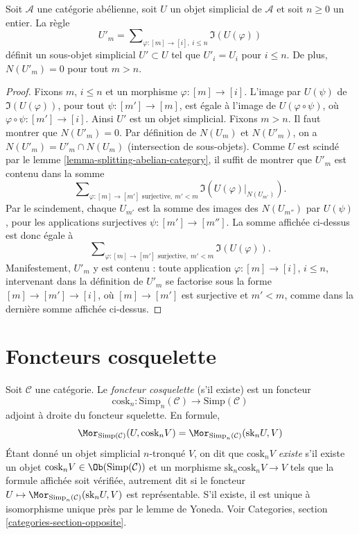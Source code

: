 \begin{lemma}
\label{lemma-simplicial-abelian-n-skel-sub}
Soit $\mathcal{A}$ une catégorie abélienne, soit $U$ un objet simplicial
de $\mathcal{A}$ et soit $n \geq 0$ un entier. La règle
$$
U'_m = \sum\nolimits_{\varphi : [m] \to [i], \ i\leq n} \Im(U(\varphi))
$$
définit un sous-objet simplicial $U' \subset U$ tel que $U'_i = U_i$
pour $i \leq n$. De plus, $N(U'_m) = 0$ pour tout $m > n$.
\end{lemma}

\begin{proof}
Fixons $m$, $i \leq n$ et un morphisme $\varphi : [m] \to [i]$.
L'image par $U(\psi)$ de $\Im(U(\varphi))$, pour tout
$\psi : [m'] \to [m]$, est égale à l'image de
$U(\varphi \circ \psi)$, où
$\varphi \circ \psi : [m'] \to [i]$. Ainsi $U'$ est un objet
simplicial. Fixons $m > n$. Il faut montrer que $N(U'_m) = 0$.
Par définition de $N(U_m)$ et $N(U'_m)$, on a
$N(U'_m) = U'_m \cap N(U_m)$ (intersection de sous-objets).
Comme $U$ est scindé par le lemme
\ref{lemma-splitting-abelian-category}, il suffit de montrer que $U'_m$
est contenu dans la somme
$$
\sum\nolimits_{\varphi : [m] \to [m']\text{ surjective}, \ m' < m}
\Im(U(\varphi)|_{N(U_{m'})}).
$$
Par le scindement, chaque $U_{m'}$ est la somme des images des
$N(U_{m''})$ par $U(\psi)$, pour les applications surjectives
$\psi : [m'] \to [m'']$. La somme affichée ci-dessus est donc égale à
$$
\sum\nolimits_{\varphi : [m] \to [m']\text{ surjective}, \ m' < m}
\Im(U(\varphi)).
$$
Manifestement, $U'_m$ y est contenu : toute application
$\varphi : [m] \to [i]$, $i \leq n$, intervenant dans la définition de
$U'_m$ se factorise sous la forme $[m] \to [m'] \to [i]$, où
$[m] \to [m']$ est surjective et $m' < m$, comme dans la dernière somme
affichée ci-dessus.
\end{proof}




\section{Foncteurs cosquelette}
\label{section-coskeleton}

\noindent
Soit $\mathcal{C}$ une catégorie. Le {\it foncteur cosquelette}
(s'il existe) est un foncteur
$$
\text{cosk}_n :
\text{Simp}_n(\mathcal{C}) \longrightarrow \text{Simp}(\mathcal{C})
$$
adjoint à droite du foncteur squelette. En formule,
\begin{equation}
\label{equation-cosk}
\Mor_{\text{Simp}(\mathcal{C})}(U, \text{cosk}_n V)
=
\Mor_{\text{Simp}_n(\mathcal{C})}(\text{sk}_n U, V)
\end{equation}
Étant donné un objet simplicial $n$-tronqué $V$, on dit que
{\it $\text{cosk}_nV$ existe} s'il existe un objet
$\text{cosk}_nV \in \Ob(\text{Simp}(\mathcal{C}))$ et un morphisme
$\text{sk}_n \text{cosk}_n V \to V$ tels que la formule affichée soit
vérifiée, autrement dit si le foncteur
$U \mapsto \Mor_{\text{Simp}_n(\mathcal{C})}(\text{sk}_n U, V)$
est représentable. S'il existe, il est unique à isomorphisme unique près
par le lemme de Yoneda. Voir Categories, section
\ref{categories-section-opposite}.

